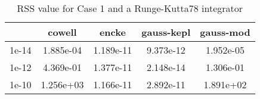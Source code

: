 \begin{table}
\centering
\begin{tabular}{|c|c|c|c|c|}
\hline
 & cowell & encke & gauss-kepl & gauss-mod \\
\hline
1e-14 & 1.885e-04 & 1.189e-11 & 9.373e-12 & 1.952e-05 \\
\hline
1e-12 & 4.369e-01 & 1.377e-11 & 2.148e-14 & 1.306e-01 \\
\hline
1e-10 & 1.256e+03 & 1.166e-11 & 2.892e-11 & 1.891e+02 \\
\hline
\end{tabular}
\caption{RSS value for Case 1 and a Runge-Kutta78 integrator}
\label{table:tab:keplerapprox_rss_C1_Runge-Kutta78}
\end{table}
